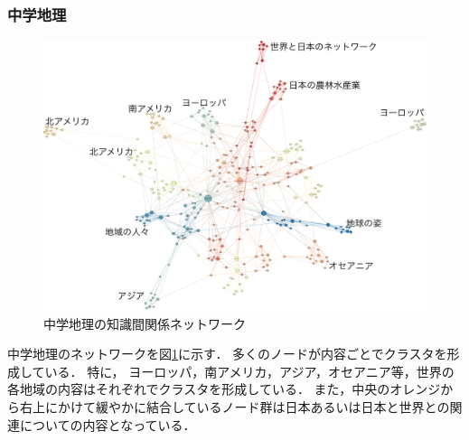 \subsubsection{中学地理}
\begin{figure}[!htb]
\begin{center}
	\includegraphics[width=330pt]{./img/c_geo_label2.pdf}
	\caption{中学地理の知識間関係ネットワーク}
	\label{fig:net_c_geo}
\end{center}
\end{figure}
中学地理のネットワークを図\ref{fig:net_c_geo}に示す．
多くのノードが内容ごとでクラスタを形成している．
特に，
ヨーロッパ，南アメリカ，アジア，オセアニア等，世界の各地域の内容はそれぞれでクラスタを形成している．
また，中央のオレンジから右上にかけて緩やかに結合しているノード群は日本あるいは日本と世界との関連についての内容となっている．






